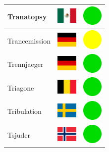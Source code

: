 \documentclass[12pt, a4paper, twoside]{report}
\begin{document}
\begin{center}
\begin{longtable}{|p{5cm}|p{2cm}|p{2cm}|}
 Tranatopsy                                                 & \includegraphics[width=1cm]{../4x3/mx} &   \includegraphics[width=1cm]{../likes/y} \\ \hline
 Trancemission                                              & \includegraphics[width=1cm]{../4x3/de} &   \includegraphics[width=1cm]{../likes/m} \\ \hline
 Trennjaeger                                                & \includegraphics[width=1cm]{../4x3/de} &   \includegraphics[width=1cm]{../likes/y} \\ \hline
 Triagone                                                   & \includegraphics[width=1cm]{../4x3/be} &   \includegraphics[width=1cm]{../likes/y} \\ \hline
 Tribulation                                                & \includegraphics[width=1cm]{../4x3/se} &   \includegraphics[width=1cm]{../likes/y} \\ \hline
 Tsjuder                                                    & \includegraphics[width=1cm]{../4x3/no} &   \includegraphics[width=1cm]{../likes/y} \\ \hline

\end{longtable}
\end{center}
\end{document}
